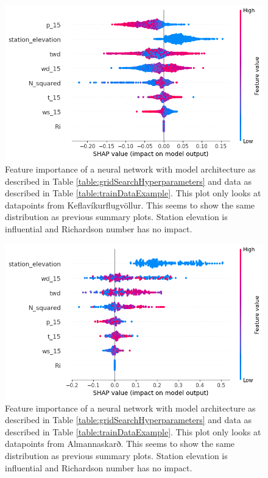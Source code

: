 \begin{figure}
    \centering
    \includegraphics[scale = 0.6]{Figures/shap_plots/summary_plot_1350.png}
    \caption[Summary feature importance of a neural network only looking at AWS at Keflavíkurflugvöllur.]{Feature importance of a neural network with model architecture as described in Table \ref{table:gridSearchHyperparameters} and data as described in Table \ref{table:trainDataExample}. This plot only looks at datapoints from Keflavíkurflugvöllur. This seems to show the same distribution as previous summary plots. Station elevation is influential and Richardson number has no impact.}
    \label{fig:ShapleySummaryKeflavikurflugvollur}
\end{figure}

\begin{figure}
    \centering
    \includegraphics[scale = 0.6]{Figures/shap_plots/summary_plot_35553.png}
    \caption[Summary feature importance of a neural network only looking at AWS at Almannaskarð.]{Feature importance of a neural network with model architecture as described in Table \ref{table:gridSearchHyperparameters} and data as described in Table \ref{table:trainDataExample}. This plot only looks at datapoints from Almannaskarð. This seems to show the same distribution as previous summary plots. Station elevation is influential and Richardson number has no impact.}
    \label{fig:ShapleySummaryAlmannaskarð}
\end{figure}


